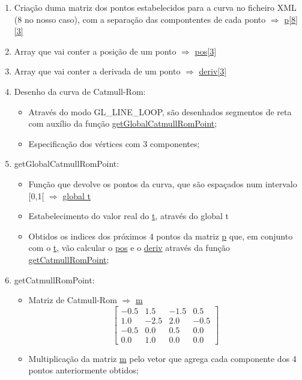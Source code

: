 \documentclass[a4paper]{article}
\begin{document}
\ttfamily
\begin{enumerate}
  \item Criação duma matriz dos pontos estabelecidos para a curva no ficheiro XML (8 no nosso caso), com a separação das compontentes de cada ponto $\Rightarrow$ \underline{p[8][3]}
  \item Array que vai conter a posição de um ponto $\Rightarrow$ \underline{pos[3]}
  \item Array que vai conter a derivada de um ponto $\Rightarrow$ \underline{deriv[3]}
  \item Desenho da curva de Catmull-Rom:
  \begin{itemize}
    \item Através do modo GL\_LINE\_LOOP, são desenhados segmentos de reta com auxílio da função \underline{getGlobalCatmullRomPoint};
    \item Especificação dos vértices com 3 componentes;
  \end{itemize}
  \item getGlobalCatmullRomPoint:
  \begin{itemize}
    \item Função que devolve os pontos da curva, que são espaçados num intervalo [0,1[ $\Rightarrow$ \underline{global t}
    \item Estabelecimento do valor real do \underline{t}, através do global t
    \item Obtidos os indices dos próximos 4 pontos da matriz \underline{p} que, em conjunto com o \underline{t}, vão calcular o \underline{pos} e o \underline{deriv} através da função \underline{getCatmullRomPoint};
  \end{itemize}
  \item getCatmullRomPoint:
  \begin{itemize}
    \item Matriz de Catmull-Rom $\Rightarrow$ \underline{m}
      \begin{displaymath}
      \begin{bmatrix}
          -0.5&1.5&-1.5&0.5\\
          1.0&-2.5&2.0&-0.5\\
          -0.5&0.0&0.5&0.0\\
          0.0&1.0&0.0&0.0
      \end{bmatrix}
      \end{displaymath}
  \item Multiplicação da matriz \underline{m} pelo vetor que agrega cada componente dos 4 pontos anteriormente obtidos;

\end{itemize}
\end{enumerate}
\end{document}
